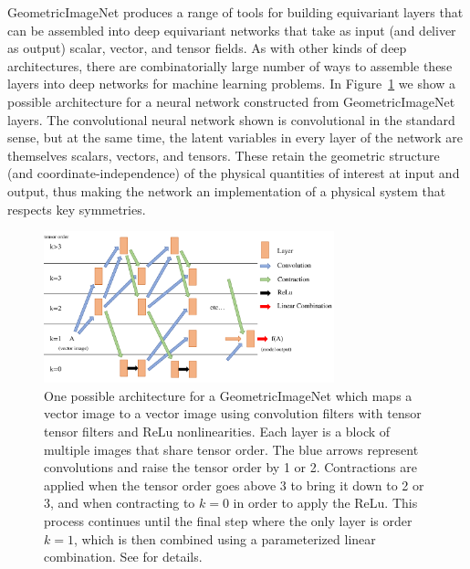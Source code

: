 \documentclass[10pt]{article}
\begin{document}
\begin{appendices}
GeometricImageNet produces a range of tools for building equivariant layers that can be assembled into deep equivariant networks that take as input (and deliver as output) scalar, vector, and tensor fields.
As with other kinds of deep architectures, there are combinatorially large number of ways to assemble these layers into deep networks for machine learning problems.
In Figure~\ref{fig:architecture} we show a possible architecture for a neural network constructed from GeometricImageNet layers.
The convolutional neural network shown is convolutional in the standard sense, but at the same time, the latent variables in every layer of the network are themselves scalars, vectors, and tensors.
These retain the geometric structure (and coordinate-independence) of the physical quantities of interest at input and output, thus making the network an implementation of a physical system that respects key symmetries.
\begin{figure}[t!]\begin{mdframed}
  \begin{center}\includegraphics[width=0.75\textwidth]{architecture_diagram.pdf}\vspace{-0.15in}\end{center}
  \caption{One possible architecture for a GeometricImageNet \cite{gregory2023geometricimagenet} which maps a vector image to a vector image using convolution filters with tensor tensor filters and ReLu nonlinearities. Each layer is a block of multiple images that share tensor order. The blue arrows represent convolutions and raise the tensor order by 1 or 2. Contractions are applied when the tensor order goes above 3 to bring it down to 2 or 3, and when contracting to $k=0$ in order to apply the ReLu. This process continues until the final step where the only layer is order $k=1$, which is then combined using a parameterized linear combination. See \cite{gregory2023geometricimagenet} for details.}
  \label{fig:architecture}
\end{mdframed}\end{figure}


\end{appendices}
\end{document}
